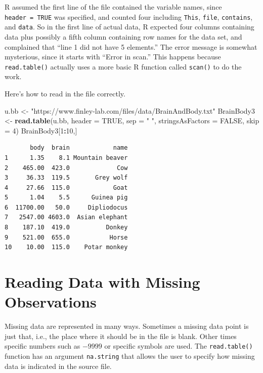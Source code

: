 \documentclass[
]{krantz}
\makeatletter
\newenvironment{Shaded}{\begin{snugshade}}{\end{snugshade}}
\newcommand{\DataTypeTok}[1]{\textcolor[rgb]{0.27,0.27,0.27}{#1}}
\newcommand{\DecValTok}[1]{\textcolor[rgb]{0.06,0.06,0.06}{#1}}
\newcommand{\KeywordTok}[1]{\textcolor[rgb]{0.27,0.27,0.27}{\textbf{#1}}}
\newcommand{\NormalTok}[1]{#1}
\newcommand{\OperatorTok}[1]{\textcolor[rgb]{0.43,0.43,0.43}{\textbf{#1}}}
\newcommand{\OtherTok}[1]{\textcolor[rgb]{0.37,0.37,0.37}{#1}}
\newcommand{\StringTok}[1]{\textcolor[rgb]{0.5,0.5,0.5}{#1}}
\newenvironment{kframe}{%
\medskip{}
\setlength{\fboxsep}{.8em}
 \def\at@end@of@kframe{}%
 \ifinner\ifhmode%
  \def\at@end@of@kframe{\end{minipage}}%
  \begin{minipage}{\columnwidth}%
 \fi\fi%
 \def\FrameCommand##1{\hskip\@totalleftmargin \hskip-\fboxsep
 \colorbox{shadecolor}{##1}\hskip-\fboxsep
     \hskip-\linewidth \hskip-\@totalleftmargin \hskip\columnwidth}%
 \MakeFramed {\advance\hsize-\width
   \@totalleftmargin\z@ \linewidth\hsize
   \@setminipage}}%
 {\par\unskip\endMakeFramed%
 \at@end@of@kframe}
\renewenvironment{Shaded}{\begin{kframe}}{\end{kframe}}
\makeatother
\begin{document}
R assumed the first line of the file contained the variable names, since \texttt{header\ =\ TRUE} was specified, and counted four including \texttt{This}, \texttt{file}, \texttt{contains}, and \texttt{data}. So in the first line of actual data, R expected four columns containing data plus possibly a fifth column containing row names for the data set, and complained that ``line 1 did not have 5 elements.'' The error message is somewhat mysterious, since it starts with ``Error in scan.'' This happens because \texttt{read.table()} actually uses a more basic R function called \texttt{scan()} to do the work.

Here's how to read in the file correctly.

\begin{Shaded}
\begin{Highlighting}[]
\NormalTok{u.bb \textless{}{-}}\StringTok{ "https://www.finley{-}lab.com/files/data/BrainAndBody.txt"}
\NormalTok{BrainBody3 \textless{}{-}}\StringTok{ }\KeywordTok{read.table}\NormalTok{(u.bb, }\DataTypeTok{header =} \OtherTok{TRUE}\NormalTok{, }\DataTypeTok{sep =} \StringTok{" "}\NormalTok{, }
                         \DataTypeTok{stringsAsFactors =} \OtherTok{FALSE}\NormalTok{, }\DataTypeTok{skip =} \DecValTok{4}\NormalTok{)}
\NormalTok{BrainBody3[}\DecValTok{1}\OperatorTok{:}\DecValTok{10}\NormalTok{,]}
\end{Highlighting}
\end{Shaded}

\begin{verbatim}
       body  brain            name
1      1.35    8.1 Mountain beaver
2    465.00  423.0             Cow
3     36.33  119.5       Grey wolf
4     27.66  115.0            Goat
5      1.04    5.5      Guinea pig
6  11700.00   50.0     Dipliodocus
7   2547.00 4603.0  Asian elephant
8    187.10  419.0          Donkey
9    521.00  655.0           Horse
10    10.00  115.0    Potar monkey
\end{verbatim}

\hypertarget{reading-data-with-missing-observations}{%
\section{Reading Data with Missing Observations}\label{reading-data-with-missing-observations}}

Missing data are represented in many ways. Sometimes a missing data point is just that, i.e., the place where it should be in the file is blank. Other times specific numbers such as \(-9999\) or specific symbols are used. The \texttt{read.table()} function has an argument \texttt{na.string} that allows the user to specify how missing data is indicated in the source file.
\end{document}
